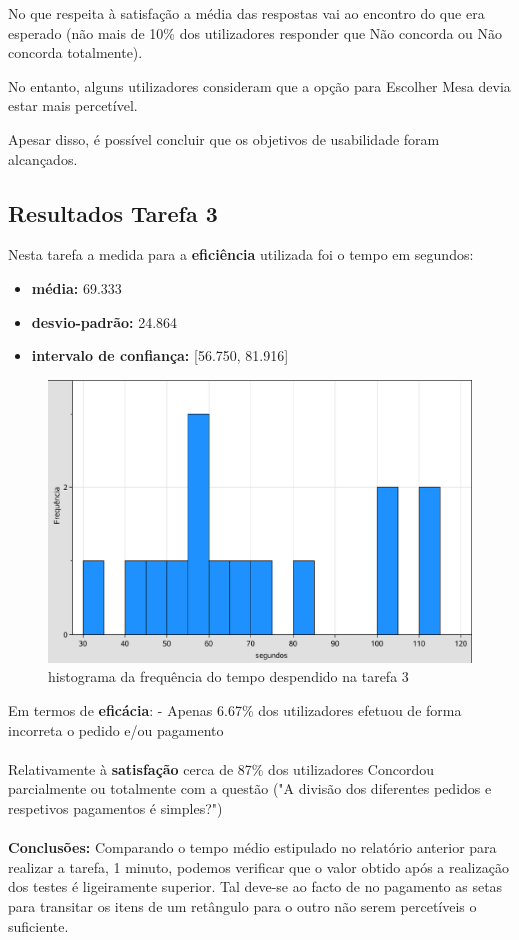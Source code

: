 \documentclass{article}
\begin{document}
No que respeita à satisfação a média das respostas vai ao encontro do que era esperado (não mais de 10\% dos utilizadores responder que Não concorda ou Não concorda totalmente).

No entanto, alguns utilizadores consideram que a opção para Escolher Mesa devia estar mais percetível.

Apesar disso, é possível concluir que os objetivos de usabilidade foram alcançados.

\subsection*{Resultados Tarefa 3}
Nesta tarefa a medida para a \textbf{eficiência} utilizada foi o tempo em segundos:
\begin{itemize}
\item\textbf{média:} 69.333 
\item\textbf{desvio-padrão:} 24.864
\item\textbf{intervalo de confiança:} [56.750, 81.916]
\end{itemize}
\begin{figure}[H]
\centering
\includegraphics[scale=0.35]{grafico3}
\caption{histograma da frequência do tempo despendido na tarefa 3}
\end{figure} Em termos de \textbf{eficácia}:
 - Apenas 6.67\% dos utilizadores efetuou de forma incorreta o pedido e/ou pagamento \\\\
Relativamente à \textbf{satisfação} cerca de 87\% dos utilizadores Concordou parcialmente ou totalmente com a questão ("A divisão dos diferentes pedidos e respetivos pagamentos é simples?")\\\\
\textbf{Conclusões:}
Comparando o tempo médio estipulado no relatório anterior para realizar a tarefa, 1 minuto, podemos verificar que o valor obtido após a realização dos testes é ligeiramente superior. Tal deve-se ao facto de no pagamento as setas para transitar os itens de um retângulo para o outro não serem percetíveis o suficiente.
\end{document}
